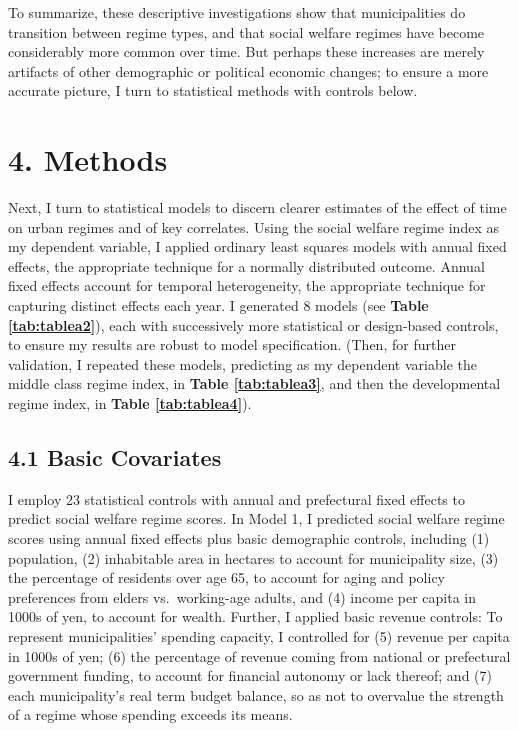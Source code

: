\documentclass[preprint, 3p,
authoryear]{elsarticle} %
\begin{document}
To summarize, these descriptive investigations show that municipalities
do transition between regime types, and that social welfare regimes have
become considerably more common over time. But perhaps these increases
are merely artifacts of other demographic or political economic changes;
to ensure a more accurate picture, I turn to statistical methods with
controls below.

\hypertarget{methods}{%
\section{4. Methods}\label{methods}}

Next, I turn to statistical models to discern clearer estimates of the
effect of time on urban regimes and of key correlates. Using the social
welfare regime index as my dependent variable, I applied ordinary least
squares models with annual fixed effects, the appropriate technique for
a normally distributed outcome. Annual fixed effects account for
temporal heterogeneity, the appropriate technique for capturing distinct
effects each year. I generated 8 models (see
\textbf{Table \ref{tab:tablea2}}), each with successively more
statistical or design-based controls, to ensure my results are robust to
model specification. (Then, for further validation, I repeated these
models, predicting as my dependent variable the middle class regime
index, in \textbf{Table \ref{tab:tablea3}}, and then the developmental
regime index, in \textbf{Table \ref{tab:tablea4}}).

\hypertarget{basic-covariates}{%
\subsection{4.1 Basic Covariates}\label{basic-covariates}}

I employ 23 statistical controls with annual and prefectural fixed
effects to predict social welfare regime scores. In Model 1, I predicted
social welfare regime scores using annual fixed effects plus basic
demographic controls, including (1) population, (2) inhabitable area in
hectares to account for municipality size, (3) the percentage of
residents over age 65, to account for aging and policy preferences from
elders vs.~working-age adults, and (4) income per capita in 1000s of
yen, to account for wealth. Further, I applied basic revenue controls:
To represent municipalities' spending capacity, I controlled for (5)
revenue per capita in 1000s of yen; (6) the percentage of revenue coming
from national or prefectural government funding, to account for
financial autonomy or lack thereof; and (7) each municipality's real
term budget balance, so as not to overvalue the strength of a regime
whose spending exceeds its means.
\end{document}
